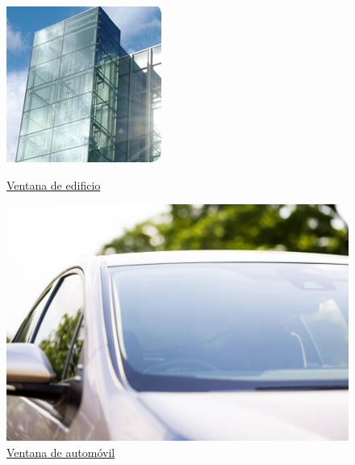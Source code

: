 \begin{figure}[H]
    \centering
    \begin{minipage}[b]{0.4\textwidth}
        \centering
        \includegraphics[width=\linewidth]{../Ejercicio-2/ImagenesEjercicio2/buildingGlass.jpg}
        \caption{\href{https://www.doubleglazedwindows.net.au/Acoustic-Windows-and-Doors-Float-Glass.html}{Ventana de edificio}}	
        \label{fig:pic1}
    \end{minipage}
    \hfill
    \begin{minipage}[b]{0.4\textwidth}
        \centering
        \includegraphics[width=\linewidth]{../Ejercicio-2/ImagenesEjercicio2/carwindowGlass.jpg}
        \caption{\href{https://www.valleyglass.com/custom-vehicles/}{Ventana de automóvil}}	
        \label{fig:pic2}
    \end{minipage}
\end{figure}
